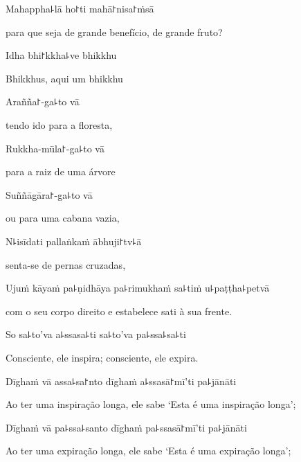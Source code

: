Mahappha꜕lā ho꜓ti mahā꜓nisa꜓ṁsā

\begin{english}
  para que seja de grande benefício, de grande fruto?
\end{english}

Idha bhi꜓kkha꜕ve bhikkhu

\begin{english}
  Bhikkhus, aqui um bhikkhu
\end{english}

Arañña꜓-ga꜕to vā

\begin{english}
  tendo ido para a floresta,
\end{english}

Rukkha-mūla꜓-ga꜕to vā

\begin{english}
  para a raiz de uma árvore
\end{english}

Suññāgāra꜓-ga꜕to vā

\begin{english}
  ou para uma cabana vazia,
\end{english}

N꜕isīdati pallaṅkaṁ ābhuji꜓tv꜕ā

\begin{english}
  senta-se de pernas cruzadas,
\end{english}

Ujuṁ kāyaṁ pa꜕ṇidhāya pa꜕rimukhaṁ sa꜕tiṁ u꜕paṭṭha꜕petvā

\begin{english}
  com o seu corpo direito e estabelece sati à sua frente.
\end{english}

So sa꜕to'va a꜕ssasa꜕ti sa꜕to'va pa꜕ssa꜕sa꜕ti

\begin{english}
  Consciente, ele inspira; consciente, ele expira.
\end{english}

Dīghaṁ vā assa꜕sa꜓nto dīghaṁ a꜕ssasā꜓mī'ti pa꜕jānāti

\begin{english}
  Ao ter uma inspiração longa, ele sabe `Esta é uma inspiração longa';
\end{english}

Dīghaṁ vā pa꜕ssa꜕santo dīghaṁ pa꜕ssasā꜓mī'ti pa꜕jānāti

\begin{english}
  Ao ter uma expiração longa, ele sabe `Esta é uma expiração longa';
\end{english}

